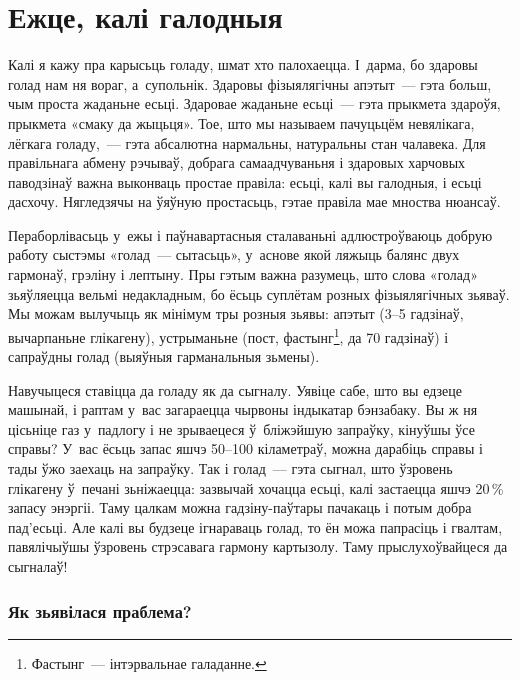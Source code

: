 \chapter{Ежце, калі галодныя}

Калі я кажу пра карысьць голаду, шмат хто палохаецца. І~дарма, бо здаровы голад нам ня вораг, а~супольнік. Здаровы фізыялягічны апэтыт~--- гэта больш, чым проста жаданьне есьці. Здаровае жаданьне есьці~--- гэта прыкмета здароўя, прыкмета «смаку да жыцьця». Тое, што мы называем пачуцьцём невялікага, лёгкага голаду,~--- гэта абсалютна нармальны, натуральны стан чалавека. Для правільнага абмену рэчываў, добрага самаадчуваньня і здаровых харчовых паводзінаў важна выконваць простае правіла: есьці, калі вы галодныя, і есьці дасхочу. Нягледзячы на ўяўную простасьць, гэтае правіла мае мноства нюансаў.

Пераборлівасьць у~ежы і паўнавартасныя сталаваньні адлюстроўваюць добрую работу сыстэмы «голад~--- сытасьць», у~аснове якой ляжыць балянс двух гармонаў, грэліну і лептыну. Пры гэтым важна разумець, што слова «голад» зьяўляецца вельмі недакладным, бо ёсьць суплётам розных фізыялягічных зьяваў. Мы можам вылучыць як мінімум тры розныя зьявы: апэтыт (3--5 гадзінаў, вычарпаньне глікагену), устрыманьне (пост, фастынг\footnote{Фастынг~--- інтэрвальнае галаданне.}, да 70 гадзінаў) і сапраўдны голад (выяўныя гарманальныя зьмены).


Навучыцеся ставіцца да голаду як да сыгналу. Уявіце сабе, што вы едзеце машынай, і раптам у~вас загараецца чырвоны індыкатар бэнзабаку. Вы ж ня цісьніце газ у~падлогу і не зрываецеся ў~бліжэйшую запраўку, кінуўшы ўсе справы? У~вас ёсьць запас яшчэ 50--100 кіламетраў, можна дарабіць справы і тады ўжо заехаць на запраўку. Так і голад~--- гэта сыгнал, што ўзровень глікагену ў~печані зьніжаецца: зазвычай хочацца есьці, калі застаецца яшчэ 20\,\% запасу энэргіі. Таму цалкам можна гадзіну-паўтары пачакаць і потым добра пад'есьці. Але калі вы будзеце ігнараваць голад, то ён можа папрасіць і гвалтам, павялічыўшы ўзровень стрэсавага гармону картызолу. Таму прыслухоўвайцеся да сыгналаў!

\subsection{Як зьявілася праблема?}

